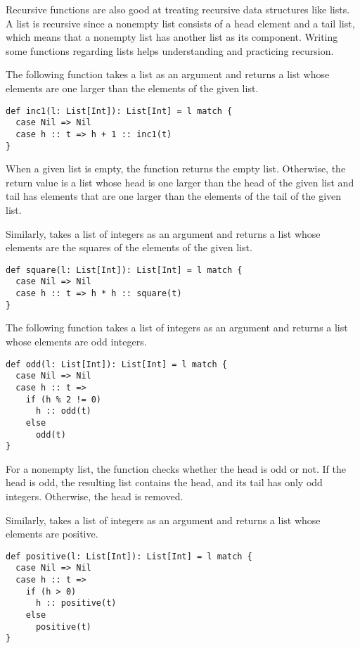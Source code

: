 Recursive functions are also good at treating recursive data structures like
lists. A list is recursive since a nonempty list consists of a head element
and a tail list, which means that a nonempty list has another list as its component.
Writing some functions regarding lists helps understanding and practicing
recursion.

The following function takes a list as an argument and returns a list whose
elements are one larger than the elements of the given list.

\begin{verbatim}
def inc1(l: List[Int]): List[Int] = l match {
  case Nil => Nil
  case h :: t => h + 1 :: inc1(t)
}
\end{verbatim}

When a given list is empty, the function returns the empty list. Otherwise, the
return value is a list whose head is one larger than the head of the given list
and tail has elements that are one larger than the elements of the tail of the
given list.

Similarly,  takes a list of integers as an argument and returns a
list whose elements are the squares of the elements of the given list.

\begin{verbatim}
def square(l: List[Int]): List[Int] = l match {
  case Nil => Nil
  case h :: t => h * h :: square(t)
}
\end{verbatim}

The following function takes a list of integers as an argument and returns a list whose
elements are odd integers.

\begin{verbatim}
def odd(l: List[Int]): List[Int] = l match {
  case Nil => Nil
  case h :: t =>
    if (h % 2 != 0)
      h :: odd(t)
    else
      odd(t)
}
\end{verbatim}

For a nonempty list, the function checks whether the head is odd or not. If the
head is odd, the resulting list contains the head, and its tail  has
only odd integers. Otherwise, the head is removed.

Similarly,  takes a list of integers as an argument and returns a
list whose elements are positive.

\begin{verbatim}
def positive(l: List[Int]): List[Int] = l match {
  case Nil => Nil
  case h :: t =>
    if (h > 0)
      h :: positive(t)
    else
      positive(t)
}
\end{verbatim}


